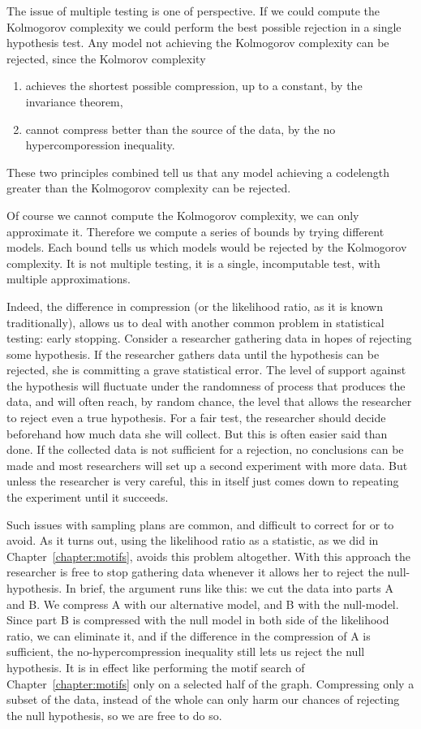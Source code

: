 The issue of multiple testing is one of perspective. If we could compute the Kolmogorov complexity we could perform the best possible rejection in a single hypothesis test. Any model not achieving the Kolmogorov complexity can be rejected, since the Kolmorov complexity
\begin{enumerate}
  \item achieves the shortest possible compression, up to a constant, by the invariance theorem,
  \item cannot compress better than the source of the data, by the no hypercomporession inequality.
\end{enumerate}
These two principles combined tell us that any model achieving a codelength greater than the Kolmogorov complexity can be rejected.

Of course we cannot compute the Kolmogorov complexity, we can only approximate it. Therefore we compute a series of bounds by trying different models. Each bound tells us which models would be rejected by the Kolmogorov complexity. It is not multiple testing, it is a single, incomputable test, with multiple approximations.

Indeed, the difference in compression (or the likelihood ratio, as it is known traditionally), allows us to deal with another common problem in statistical testing: early stopping. \footnotemark Consider a researcher gathering data in hopes of rejecting some hypothesis. If the researcher gathers data until the hypothesis can be rejected, she is committing a grave statistical error. The level of support against the hypothesis will fluctuate under the randomness of process that produces the data, and will often reach, by random chance, the level that allows the researcher to reject even a true hypothesis. For a fair test, the researcher should decide beforehand how much data she will collect. But this is often easier said than done. If the collected data is not sufficient for a rejection, no conclusions can be made and most researchers will set up a second experiment with more data. But unless the researcher is very careful, this in itself just comes down to repeating the experiment until it succeeds. 

Such issues with sampling plans are common, and difficult to correct for or to avoid. As it turns out, using the likelihood ratio as a statistic, as we did in Chapter~\ref{chapter:motifs}, avoids this problem altogether. With this approach the researcher is free to stop gathering data whenever it allows her to reject the null-hypothesis. In brief, the argument runs like this: we cut the data into parts A and B. We compress A with our alternative model, and B with the null-model. Since part B is compressed with the null model in both side of the likelihood ratio, we can eliminate it, and if the difference in the compression of A is sufficient, the no-hypercompression inequality still lets us reject the null hypothesis. It is in effect like performing the motif search of Chapter~\ref{chapter:motifs} only on a selected half of the graph. Compressing only a subset of the data, instead of the whole can only harm our chances of rejecting the null hypothesis, so we are free to do so. 

